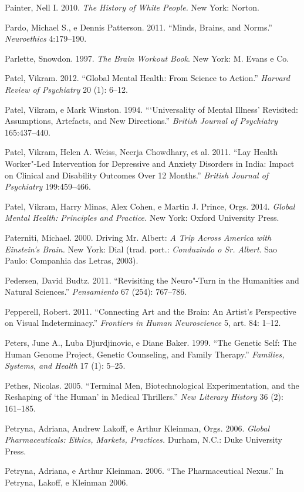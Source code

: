 Painter, Nell I. 2010. \emph{The History of White People.} New York:
Norton.

Pardo, Michael S., e Dennis Patterson. 2011. ``Minds, Brains, and
Norms.'' \emph{Neuroethics} 4:179--190.

Parlette, Snowdon. 1997. \emph{The Brain Workout Book}. New York: M.
Evans e Co.

Patel, Vikram. 2012. ``Global Mental Health: From Science to Action.''
\emph{Harvard Review of Psychiatry} 20 (1): 6--12.

Patel, Vikram, e Mark Winston. 1994. ```Universality of Mental Illness'
Revisited: Assumptions, Artefacts, and New Directions.'' \emph{British
Journal of Psychiatry} 165:437--440.

Patel, Vikram, Helen A. Weiss, Neerja Chowdhary, et al. 2011. ``Lay
Health Worker"-Led Intervention for Depressive and Anxiety Disorders in
India: Impact on Clinical and Disability Outcomes Over 12 Months.''
\emph{British Journal of Psychiatry} 199:459--466.

Patel, Vikram, Harry Minas, Alex Cohen, e Martin J. Prince, Orgs. 2014.
\emph{Global Mental Health: Principles and Practice.} New York: Oxford
University Press.

Paterniti, Michael. 2000. Driving Mr. Albert: \emph{A Trip Across
America with Einstein's Brain.} New York: Dial (trad. port.:
\emph{Conduzindo o Sr. Albert}. Sao Paulo: Companhia das Letras, 2003).

Pedersen, David Budtz. 2011. ``Revisiting the Neuro"-Turn in the
Humanities and Natural Sciences.'' \emph{Pensamiento} 67 (254):
767--786.

Pepperell, Robert. 2011. ``Connecting Art and the Brain: An Artist's
Perspective on Visual Indeterminacy.'' \emph{Frontiers in Human
Neuroscience} 5, art. 84: 1--12.

Peters, June A., Luba Djurdjinovic, e Diane Baker. 1999. ``The Genetic
Self: The Human Genome Project, Genetic Counseling, and Family
Therapy.'' \emph{Families, Systems, and Health} 17 (1): 5--25.

Pethes, Nicolas. 2005. ``Terminal Men, Biotechnological Experimentation,
and the Reshaping of `the Human' in Medical Thrillers.'' \emph{New
Literary History} 36 (2): 161--185.

Petryna, Adriana, Andrew Lakoff, e Arthur Kleinman, Orgs. 2006.
\emph{Global Pharmaceuticals: Ethics, Markets, Practices.} Durham, N.C.:
Duke University Press.

Petryna, Adriana, e Arthur Kleinman. 2006. ``The Pharmaceutical Nexus.''
In Petryna, Lakoff, e Kleinman 2006.

